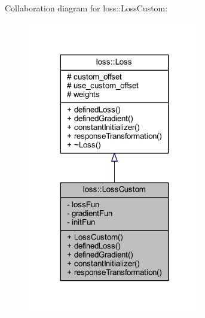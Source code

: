 Collaboration diagram for loss\+:\+:Loss\+Custom\+:
\nopagebreak
\begin{figure}[H]
\begin{center}
\leavevmode
\includegraphics[width=215pt]{classloss_1_1_loss_custom__coll__graph}
\end{center}
\end{figure}
